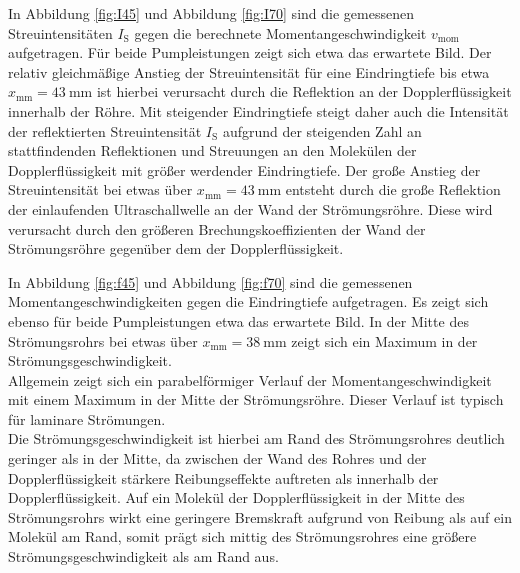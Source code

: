 In Abbildung \ref{fig:I45} und Abbildung \ref{fig:I70} sind die gemessenen Streuintensitäten $I_\mathrm{S}$ gegen die berechnete Momentangeschwindigkeit $v_\mathrm{mom}$ aufgetragen. Für beide Pumpleistungen zeigt sich etwa das erwartete Bild.
Der relativ gleichmäßige Anstieg der Streuintensität für eine Eindringtiefe bis etwa $x_\mathrm{mm}=\SI{43}{\milli\meter}$ ist hierbei verursacht durch die Reflektion an der Dopplerflüssigkeit innerhalb der Röhre. Mit steigender Eindringtiefe steigt daher auch die Intensität der reflektierten Streuintensität $I_\mathrm{S}$ aufgrund der steigenden Zahl an stattfindenden Reflektionen und Streuungen an den Molekülen der Dopplerflüssigkeit mit größer werdender Eindringtiefe.
Der große Anstieg der Streuintensität bei etwas über $x_\mathrm{mm}=\SI{43}{\milli\meter}$ entsteht durch die große Reflektion der einlaufenden Ultraschallwelle an der Wand der Strömungsröhre. Diese wird verursacht durch den größeren Brechungskoeffizienten der Wand der Strömungsröhre gegenüber dem der Dopplerflüssigkeit.


In Abbildung \ref{fig:f45} und Abbildung \ref{fig:f70} sind die gemessenen Momentangeschwindigkeiten gegen die Eindringtiefe aufgetragen. Es zeigt sich ebenso für beide Pumpleistungen etwa das erwartete Bild.
In der Mitte des Strömungsrohrs bei etwas  über $x_\mathrm{mm}=\SI{38}{\milli\meter}$ zeigt sich ein Maximum in der Strömungsgeschwindigkeit.\\
Allgemein zeigt sich ein parabelförmiger Verlauf der Momentangeschwindigkeit mit einem Maximum in der Mitte der Strömungsröhre. Dieser Verlauf ist typisch für laminare Strömungen.
\\Die Strömungsgeschwindigkeit ist hierbei am Rand des Strömungsrohres deutlich geringer als in der Mitte, da zwischen der Wand des Rohres und der Dopplerflüssigkeit stärkere Reibungseffekte auftreten als innerhalb der Dopplerflüssigkeit. Auf ein Molekül der Dopplerflüssigkeit in der Mitte des Strömungsrohrs wirkt eine geringere Bremskraft aufgrund von Reibung als auf ein Molekül am Rand, somit prägt sich mittig des Strömungsrohres eine größere Strömungsgeschwindigkeit als am Rand aus.

